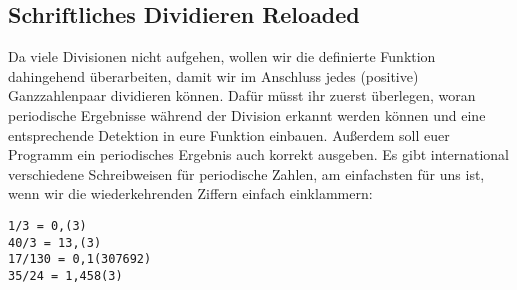\subsection{Schriftliches Dividieren Reloaded }
Da viele Divisionen nicht aufgehen, wollen wir die definierte Funktion dahingehend überarbeiten, damit wir im Anschluss jedes (positive) Ganzzahlenpaar dividieren können. Dafür müsst ihr zuerst überlegen, woran periodische Ergebnisse während der Division erkannt werden können und eine entsprechende Detektion in eure Funktion einbauen. Außerdem soll euer Programm ein periodisches Ergebnis auch korrekt ausgeben. Es gibt international verschiedene Schreibweisen für periodische Zahlen, am einfachsten für uns ist, wenn wir die wiederkehrenden Ziffern einfach einklammern:
\begin{lstlisting}
1/3 = 0,(3)
40/3 = 13,(3)
17/130 = 0,1(307692)
35/24 = 1,458(3)
\end{lstlisting}
